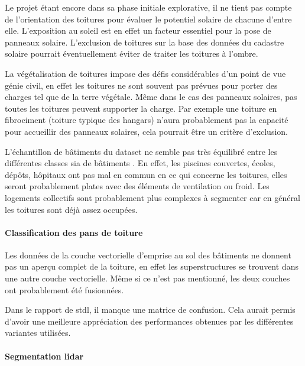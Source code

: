 \par{Le projet étant encore dans sa phase initiale explorative, il ne tient pas compte de l'orientation des toitures pour évaluer le potentiel solaire de chacune d'entre elle. L'exposition au soleil est en effet un facteur essentiel pour la pose de panneaux solaire. L'exclusion de toitures sur la base des données du cadastre solaire pourrait éventuellement éviter de traiter les toitures à l'ombre.}

\par{La végétalisation de toitures impose des défis considérables d'un point de vue génie civil, en effet les toitures ne sont souvent pas prévues pour porter des charges tel que de la terre végétale. Même dans le cas des panneaux solaires, pas toutes les toitures peuvent supporter la charge. Par exemple une toiture en fibrociment (toiture typique des hangars) n'aura probablement pas la capacité pour accueillir des panneaux solaires, cela pourrait être un critère d'exclusion.}

\par{L'échantillon de bâtiments du dataset ne semble pas très équilibré entre les différentes classes \gls{sia} de bâtiments \cite{sia_sia-shop_nodate}. En effet, les piscines couvertes, écoles, dépôts, hôpitaux ont pas mal en commun en ce qui concerne les toitures, elles seront probablement plates avec des éléments de ventilation ou froid. Les logements collectifs sont probablement plus complexes à segmenter car en général les toitures sont déjà assez occupées.}

\paragraph{Classification des pans de toiture}

\par{Les données de la couche vectorielle d'emprise au sol des bâtiments ne donnent pas un aperçu complet de la toiture, en effet les superstructures se trouvent dans une autre couche vectorielle. Même si ce n'est pas mentionné, les deux couches ont probablement été fusionnées.}

\par{Dans le rapport de \acrshort{stdl}, il manque une matrice de confusion. Cela aurait permis d'avoir une meilleure appréciation des performances obtenues par les différentes variantes utilisées.}

\paragraph{Segmentation \gls{lidar}}

